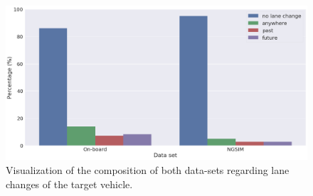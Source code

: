 \begin{figure}[t]
    \centering
    \includegraphics[width=0.9\linewidth]{imgs/data_set_lane_change_distribution.png}
    \caption{Visualization of the composition of both data-sets regarding lane changes of the target vehicle.}
    \label{fig:data_set_lane_change_distribution}
\end{figure}

